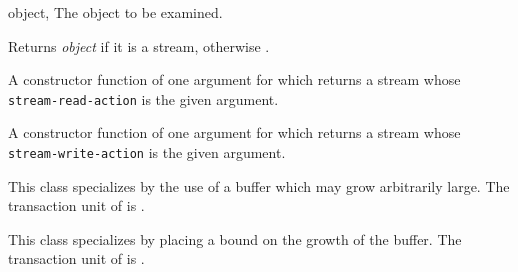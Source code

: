 \begin{optDefinition}
\begin{arguments}
  \item[object, \classref{object}] The object to be examined.
\end{arguments}
%
\result%
Returns {\em object\/} if it is a stream, otherwise \nil{}.

A constructor function of one argument for  which
returns a stream whose {\tt stream-read-action} is the given argument.

A constructor function of one argument for  which returns a
stream whose {\tt stream-write-action} is the given argument.

%
This class specializes  by the use of a buffer which may grow
arbitrarily large. The transaction unit of  is
.

%
This class specializes  by placing a bound on the
growth of the buffer. The transaction unit of 
is .


\end{optDefinition}
